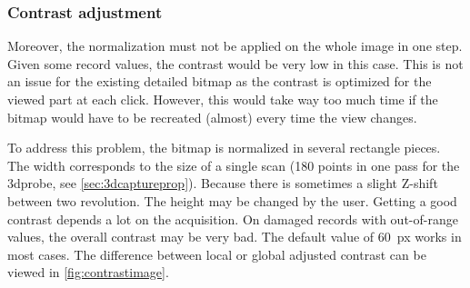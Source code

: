 \subsubsection{Contrast adjustment}

Moreover, the normalization must not be applied on the whole image in one step. Given some record values, the contrast would be very low in this case. This is not an issue for the existing detailed bitmap as the contrast is optimized for the viewed part at each click. However, this would take way too much time if the bitmap would have to be recreated (almost) every time the view changes.

To address this problem, the bitmap is normalized in several rectangle pieces. The width corresponds to the size of a single scan (180 points in one pass for the \gls{3dprobe}, see \autoref{sec:3dcaptureprop}). Because there is sometimes a slight Z-shift between two revolution. The height may be changed by the user. Getting a good contrast depends a lot on the acquisition. On damaged records with out-of-range values, the overall contrast may be very bad. The default value of \SI{60}{px} works in most cases. The difference between local or global adjusted contrast can be viewed in \autoref{fig:contrastimage}.

